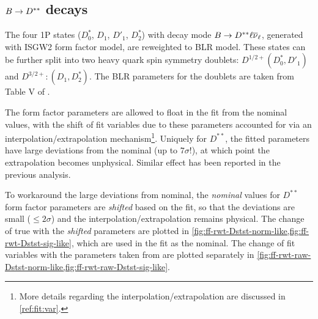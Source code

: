 \subsection{$B \rightarrow D^{**}$ decays}

The four 1P \Dstst states ($D^*_0$, $D_1$, $D'_1$, $D^*_2$) with decay mode
$B \rightarrow D^{**}{\ell}{{\overline{\nu}}_\ell}$,
generated with ISGW2 form factor model,
are reweighted to BLR model.
These \Dstst states can be further split into two heavy quark spin symmetry
doublets: $D^{1/2+} (D^*_0, D'_1)$ and $D^{3/2+}: (D_1, D^*_2)$.
The BLR parameters for the doublets are taken from Table V of
\cite{Bernlochner_2018}.

The form factor parameters are allowed to float in the fit from the nominal
values, with the shift of fit variables due to these parameters accounted for
via an interpolation/extrapolation mechanism\footnote{
    More details regarding the interpolation/extrapolation are discussed
    in \cref{ref:fit:var}.
}.
Uniquely for $D^{**}$, the fitted parameters have large deviations from the
nominal (up to $7\sigma$!), at which point the extrapolation becomes
unphysical.
Similar effect has been reported in the previous analysis.

To workaround the large deviations from nominal, the \emph{nominal} values for
$D^{**}$ form factor parameters are \emph{shifted} based on the fit, so that
the deviations are small ($\leq 2\sigma$) and the
interpolation/extrapolation remains physical.
The change of true \qSq with the \emph{shifted} parameters are
plotted in \cref{fig:ff-rwt-Dstst-norm-like,fig:ff-rwt-Dstst-sig-like},
which are used in the fit as the nominal.
The change of fit variables with the parameters taken from
\cite{Bernlochner_2018} are plotted separately in
\cref{fig:ff-rwt-raw-Dstst-norm-like,fig:ff-rwt-raw-Dstst-sig-like}.

